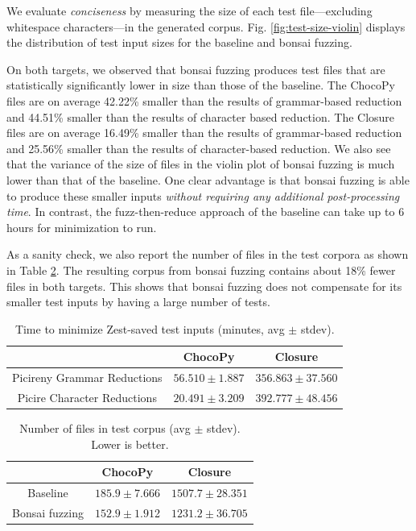 \documentclass[conference]{IEEEtran}
\newcommand{\tech}{bonsai fuzzing} \newcommand{\Tech}{Bonsai fuzzing} \newcommand{\TECH}{Bonsai Fuzzing}
\begin{document}
We evaluate \emph{conciseness} by measuring the size of each test file---excluding whitespace characters---in the generated corpus. Fig. \ref{fig:test-size-violin} displays the distribution of test input sizes for the baseline and \tech{}.

On both targets, we observed that \tech{} produces test files that are statistically significantly lower in size than those of the baseline. The ChocoPy files are on average 42.22\% smaller than the results of grammar-based reduction and 44.51\% smaller than the results of character based reduction. The Closure files are on average 16.49\% smaller than the results of grammar-based reduction and 25.56\% smaller than the results of character-based reduction. We also see that the variance of the size of files in the violin plot of \tech{} is much lower than that of the baseline. One clear advantage is that \tech{} is able to produce these smaller inputs \textit{without requiring any additional post-processing time}. In contrast, the fuzz-then-reduce approach of the baseline can take up to 6 hours for minimization to run. 

As a sanity check, we also report the number of files in the test corpora as shown in Table {\ref{tab:corpus-size}}. The resulting corpus from \tech{} contains about 18\% fewer files in both targets. This shows that \tech{} does not compensate for its smaller test inputs by having a large number of tests.


\begin{table}[t]
    \centering
    \caption{Time to minimize Zest-saved test inputs (minutes, avg $\pm$ stdev).}
    \label{tab:reduction-times}
        \begin{tabular}{ |c||c|c|  }
         \hline
            & ChocoPy & Closure\\
            \hline
            Picireny Grammar Reductions & $56.510 \pm 1.887$ & $356.863 \pm 37.560$ \\
            \hline
            Picire Character Reductions & $20.491 \pm 3.209$ & $392.777 \pm 48.456$ \\
            \hline
        \end{tabular}
\end{table}

\begin{table}[t]
\centering
 \caption{Number of files in test corpus (avg $\pm$ stdev). Lower is better.}
 \label{tab:corpus-size}
        \begin{tabular}{ |c||c|c|  }
         \hline
            & ChocoPy & Closure\\
            \hline
            Baseline & $185.9 \pm 7.666$ & $1507.7 \pm 28.351$ \\
            \hline
            \Tech{} & $152.9 \pm 1.91$2 & $1231.2 \pm 36.705$\\
            \hline
        \end{tabular}
\end{table}
\end{document}
